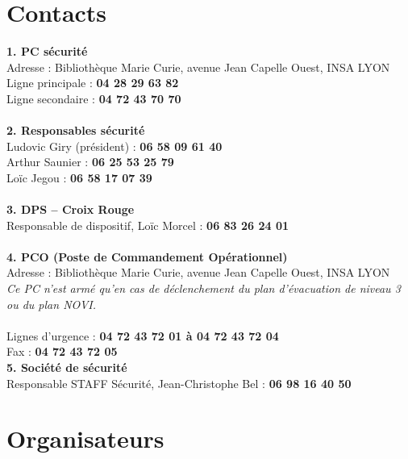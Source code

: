 \documentclass[hidelinks, paper=a4, fontsize=13pt]{report}
\begin{document}
\section{Contacts}
\label{refTelPC}

\textbf{1. PC sécurité}\\
Adresse : Bibliothèque Marie Curie, avenue Jean Capelle Ouest, INSA LYON\\
Ligne principale : \textbf{04 28 29 63 82}\\
Ligne secondaire : \textbf{04 72 43 70 70}\\\\

\textbf{2. Responsables sécurité}\\
Ludovic Giry (président) : \textbf{06 58 09 61 40}\\
Arthur Saunier : \textbf{06 25 53 25 79}\\
Loïc Jegou : \textbf{06 58 17 07 39}\\
\\

\textbf{3. DPS – Croix Rouge}\\
Responsable de dispositif, Loïc Morcel : \textbf{06 83 26 24 01}\\\\

\textbf{4. PCO (Poste de Commandement Opérationnel)}\\
Adresse : Bibliothèque Marie Curie, avenue Jean Capelle Ouest, INSA LYON\\
\textit{Ce PC n’est armé qu'en cas de déclenchement du plan d'évacuation de niveau 3 ou du plan NOVI.\\\\
}Lignes d’urgence : 			\textbf{04 72 43 72 01   à 	04 72 43 72 04}\\
Fax : 					\textbf{04 72 43 72 05}\\

\textbf{5. Société de sécurité}\\
Responsable STAFF Sécurité, Jean-Christophe Bel : \textbf{06 98 16 40 50}\\
 
\newpage

\section{Organisateurs}
\label{refTelOrgas}

\tabletail{\hline}
\end{document}
